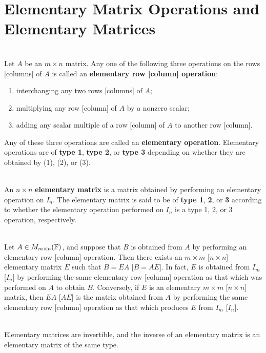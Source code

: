 \section{Elementary Matrix Operations and Elementary Matrices}

\begin{definition}
	\hfill\\
	Let $A$ be an $m \times n$ matrix. Any one of the following three operations on the rows [columns] of $A$ is called an \textbf{elementary row [column] operation}:

	\begin{enumerate}
		\item interchanging any two rows [columns] of $A$;
		\item multiplying any row [column] of $A$ by a nonzero scalar;
		\item adding any scalar multiple of a row [column] of $A$ to another row [column].
	\end{enumerate}

	Any of these three operations are called an \textbf{elementary operation}. Elementary operations are of \textbf{type 1}, \textbf{type 2}, or \textbf{type 3} depending on whether they are obtained by (1), (2), or (3).
\end{definition}

\begin{definition}
	\hfill\\
	An $n \times n$ \textbf{elementary matrix} is a matrix obtained by performing an elementary operation on $I_n$. The elementary matrix is said to be of \textbf{type 1}, \textbf{2}, or \textbf{3} according to whether the elementary operation performed on $I_n$ is a type 1, 2, or 3 operation, respectively.
\end{definition}

\begin{theorem}
	\hfill\\
	Let $A \in M_{m \times n}(\mathbb{F})$, and suppose that $B$ is obtained from $A$ by performing an elementary row [column] operation. Then there exists an $m \times m$ [$n \times n$] elementary matrix $E$ such that $B = EA$ [$B = AE]$. In fact, $E$ is obtained from $I_m$ [$I_n]$ by performing the same elementary row [column] operation as that which was performed on $A$ to obtain $B$. Conversely, if $E$ is an elementary $m \times m$ [$n \times n$] matrix, then $EA$ [$AE$] is the matrix obtained from $A$ by performing the same elementary row [column] operation as that which produces $E$ from $I_m$ [$I_n$].
\end{theorem}

\begin{theorem}
	\hfill\\
	Elementary matrices are invertible, and the inverse of an elementary matrix is an elementary matrix of the same type.
\end{theorem}
